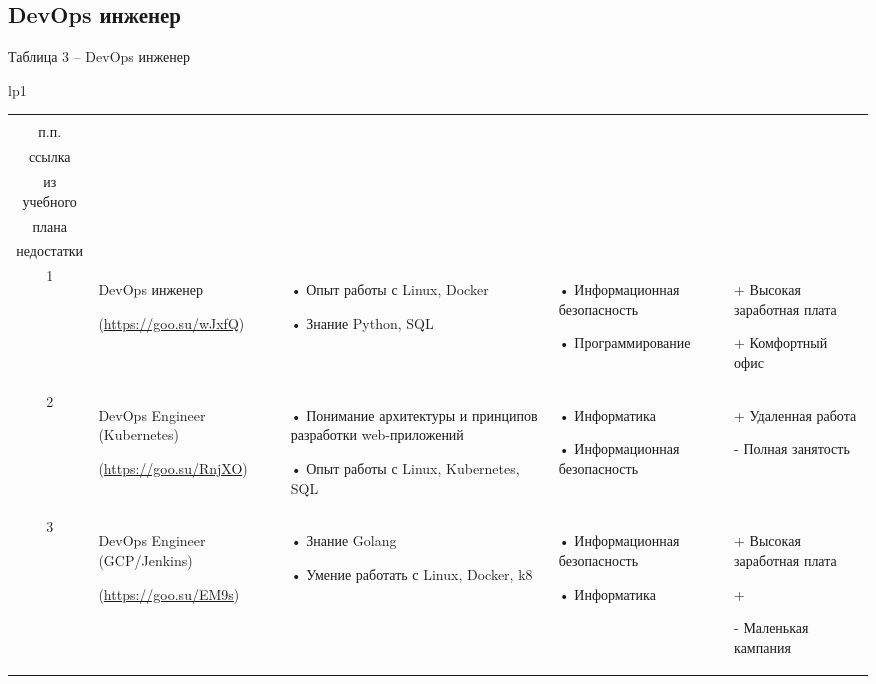 \documentclass[14pt]{extreport}
\begin{document}
\begin{landscape}
\newpage
\section{DevOps инженер}
Таблица 3 – DevOps инженер
\begin{longtable}[H]{lp{1\linewidth}}
\caption{DevOps инженер \label{table3}}


\centering

\begin{small}


    \begin{tabular}{|c|p{}|p{6cm}|p{5cm}|p{5cm}|}
	\hline 
	\makecell{№ \\ п.п.} &	\makecell{Название должности,\\ ссылка} &	\makecell{Требования} & 	\makecell{Дисциплины \\ из учебного \\плана} &	\makecell{Преимущества и \\недостатки}  \\ 
	\hline 
	1	& DevOps инженер
	
(\url{https://goo.su/wJxfQ}) &
•	Опыт работы с Linux, Docker

• Знание Python, SQL &
•	Информационная безопасность

•	Программирование &
+	Высокая заработная плата

+	Комфортный офис
 \\


	\hline
	2	& DevOps Engineer (Kubernetes)
	
(\url{https://goo.su/RnjXO}) &
•	Понимание архитектуры и принципов разработки web-приложений

•	Опыт работы с Linux, Kubernetes, SQL &
•	Информатика

•	Информационная безопасность &
+	Удаленная работа

-	Полная занятость
\\

	\hline 
	3	& DevOps Engineer (GCP/Jenkins)
	
(\url{https://goo.su/EM9s}) 	&
•	Знание Golang

•	Умение работать с Linux, Docker, k8 &
•	Информационная безопасность

•	Информатика &
+	Высокая заработная плата

+	

-	Маленькая кампания \\


	\hline


    \end{tabular}
    \end{small}
\end{longtable}


\end{landscape}
\end{document}
